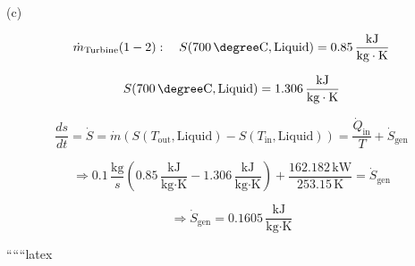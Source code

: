 (c) 

\[
\dot{m}_{\text{Turbine}} (1-2): \quad S(700 \, \degree \text{C}, \text{Liquid}) = 0.85 \, \frac{\text{kJ}}{\text{kg} \cdot \text{K}}
\]

\[
S(700 \, \degree \text{C}, \text{Liquid}) = 1.306 \, \frac{\text{kJ}}{\text{kg} \cdot \text{K}}
\]

\[
\frac{ds}{dt} = \dot{S} = \dot{m} \left( S(T_{\text{out}}, \text{Liquid}) - S(T_{\text{in}}, \text{Liquid}) \right) = \frac{\dot{Q}_{\text{in}}}{T} + \dot{S}_{\text{gen}}
\]

\[
\Rightarrow 0.1 \, \frac{\text{kg}}{s} \left( 0.85 \, \frac{\text{kJ}}{\text{kg} \cdot \text{K}} - 1.306 \, \frac{\text{kJ}}{\text{kg} \cdot \text{K}} \right) + \frac{162.182 \, \text{kW}}{253.15 \, \text{K}} = \dot{S}_{\text{gen}}
\]

\[
\Rightarrow \dot{S}_{\text{gen}} = 0.1605 \, \frac{\text{kJ}}{\text{kg} \cdot \text{K}}
\]

``````latex